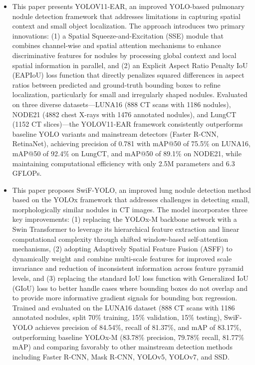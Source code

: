 \begin{itemize}
	\item This paper presents YOLOV11-EAR, an improved YOLO-based pulmonary nodule detection framework that addresses limitations in capturing spatial context and small object localization. The approach introduces two primary innovations: (1) a Spatial Squeeze-and-Excitation (SSE) module that combines channel-wise and spatial attention mechanisms to enhance discriminative features for nodules by processing global context and local spatial information in parallel, and (2) an Explicit Aspect Ratio Penalty IoU (EAPIoU) loss function that directly penalizes squared differences in aspect ratios between predicted and ground-truth bounding boxes to refine localization, particularly for small and irregularly shaped nodules. Evaluated on three diverse datasets—LUNA16 (888 CT scans with 1186 nodules), NODE21 (4882 chest X-rays with 1476 annotated nodules), and LungCT (1152 CT slices)—the YOLOV11-EAR framework consistently outperforms baseline YOLO variants and mainstream detectors (Faster R-CNN, RetinaNet), achieving precision of 0.781 with mAP@50 of 75.5\% on LUNA16, mAP@50 of 92.4\% on LungCT, and mAP@50 of 89.1\% on NODE21, while maintaining computational efficiency with only 2.5M parameters and 6.3 GFLOPs.\cite{s25144245}
	\item This paper proposes SwiF-YOLO, an improved lung nodule detection method based on the YOLOx framework that addresses challenges in detecting small, morphologically similar nodules in CT images. The model incorporates three key improvements: (1) replacing the YOLOx-M backbone network with a Swin Transformer to leverage its hierarchical feature extraction and linear computational complexity through shifted window-based self-attention mechanisms, (2) adopting Adaptively Spatial Feature Fusion (ASFF) to dynamically weight and combine multi-scale features for improved scale invariance and reduction of inconsistent information across feature pyramid levels, and (3) replacing the standard IoU loss function with Generalized IoU (GIoU) loss to better handle cases where bounding boxes do not overlap and to provide more informative gradient signals for bounding box regression. Trained and evaluated on the LUNA16 dataset (888 CT scans with 1186 annotated nodules, split 70\% training, 15\% validation, 15\% testing), SwiF-YOLO achieves precision of 84.54\%, recall of 81.37\%, and mAP of 83.17\%, outperforming baseline YOLOx-M (83.78\% precision, 79.78\% recall, 81.77\% mAP) and comparing favorably to other mainstream detection methods including Faster R-CNN, Mask R-CNN, YOLOv5, YOLOv7, and SSD. \cite{article1}

\end{itemize}
